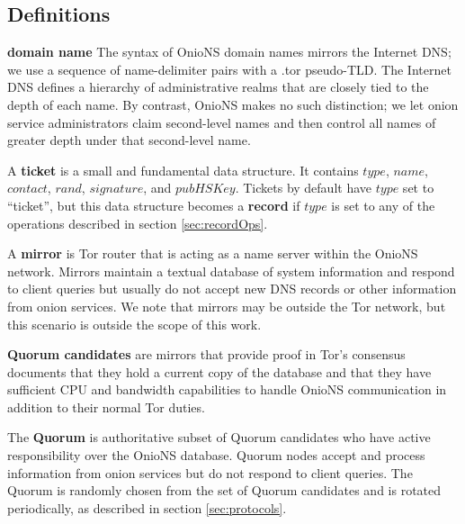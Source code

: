 \documentclass[USenglish,oneside,twocolumn]{article}
\begin{document}
\subsection{Definitions}

\textbf{domain name} The syntax of OnioNS domain names mirrors the Internet DNS; we use a sequence of name-delimiter pairs with a .tor pseudo-TLD. The Internet DNS defines a hierarchy of administrative realms that are closely tied to the depth of each name. By contrast, OnioNS makes no such distinction; we let onion service administrators claim second-level names and then control all names of greater depth under that second-level name.

A \textbf{ticket} is a small and fundamental data structure. It contains $ \mathit{type} $, $ \mathit{name} $, $ \mathit{contact} $, $ \mathit{rand} $, $ \mathit{signature} $, and $ \mathit{pubHSKey} $. Tickets by default have $ \mathit{type} $ set to ``ticket'', but this data structure becomes a \textbf{record} if $ \mathit{type} $ is set to any of the operations described in section \ref{sec:recordOps}.

A \textbf{mirror} is Tor router that is acting as a name server within the OnioNS network. Mirrors maintain a textual database of system information and respond to client queries but usually do not accept new DNS records or other information from onion services. We note that mirrors may be outside the Tor network, but this scenario is outside the scope of this work.

\textbf{Quorum candidates} are mirrors that provide proof in Tor's consensus documents that they hold a current copy of the database and that they have sufficient CPU and bandwidth capabilities to handle OnioNS communication in addition to their normal Tor duties.

The \textbf{Quorum} is authoritative subset of Quorum candidates who have active responsibility over the OnioNS database. Quorum nodes accept and process information from onion services but do not respond to client queries. The Quorum is randomly chosen from the set of Quorum candidates and is rotated periodically, as described in section \ref{sec:protocols}.
\end{document}
